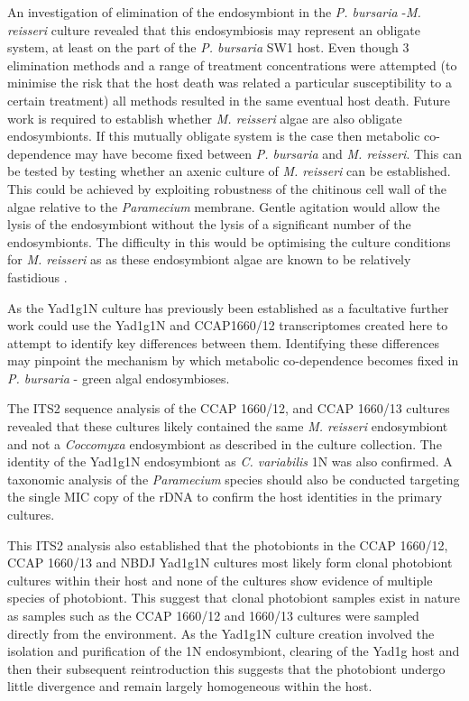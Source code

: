
An investigation of elimination of the endosymbiont in the \textit{P. bursaria}
-\textit{M. reisseri} culture revealed that this endosymbiosis
may represent an obligate system, at least on the part of the
\textit{P. bursaria} SW1 host.  Even though 3 elimination methods and
a range of treatment concentrations were attempted (to minimise the 
risk that the host death was related a particular susceptibility to a 
certain treatment) all methods resulted in the same eventual host death.
Future work is required to establish whether \textit{M. reisseri}
algae are also obligate endosymbionts.  If this mutually obligate system is 
the case then metabolic co-dependence may have become fixed between
\textit{P. bursaria} and \textit{M. reisseri}.
This can be tested by testing whether an axenic culture of 
\textit{M. reisseri} can be established. 
This could be achieved
by exploiting robustness of the chitinous cell wall
of the algae relative to the \textit{Paramecium} membrane. Gentle agitation
would allow the lysis of the endosymbiont without the lysis of a significant
number of the endosymbionts.  The difficulty in this would be optimising
the culture conditions for \textit{M. reisseri} as 
as these endosymbiont algae are known to be relatively fastidious \citep{Hoshina2009}.

As the Yad1g1N culture has previously been established as
a facultative further work could use the Yad1g1N and CCAP1660/12 
transcriptomes created here to attempt to identify key differences 
between them.  Identifying these differences may pinpoint
the mechanism by which metabolic co-dependence becomes fixed in \textit{P. bursaria}
- green algal endosymbioses.

The ITS2 sequence analysis of the CCAP 1660/12,
and CCAP 1660/13 cultures revealed that these cultures likely contained 
the same \textit{M. reisseri} endosymbiont and not a \textit{Coccomyxa}
endosymbiont as described in the culture collection. 
The identity of the Yad1g1N endosymbiont
as \textit{C. variabilis} 1N was also confirmed.
A taxonomic analysis of the \textit{Paramecium} species
should also be conducted targeting the single MIC copy of the rDNA
to confirm the host identities in the primary cultures. 

This ITS2 analysis also established that 
the photobionts in the CCAP 1660/12, CCAP 1660/13
and NBDJ Yad1g1N cultures most likely form
clonal photobiont cultures within their host and none
of the cultures show evidence of multiple species of photobiont.
This suggest that clonal photobiont samples exist
in nature as samples such as the CCAP 1660/12 and 1660/13
cultures were sampled directly from the environment.  
As the Yad1g1N culture creation involved
the isolation and purification of the 1N endosymbiont, 
clearing of the Yad1g host and then their subsequent
reintroduction this suggests that the photobiont
undergo little divergence and remain largely
homogeneous within the host.

